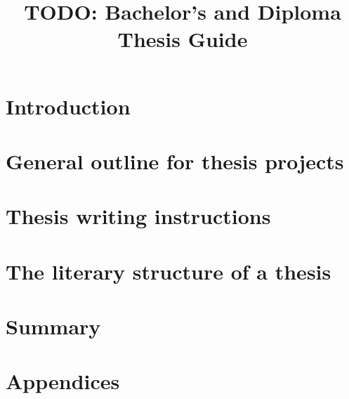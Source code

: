 \documentclass[english, online, cse, master]{dithesis}
\title{TODO: Bachelor's and Diploma Thesis Guide}
\begin{document}
\pagestyle{empty}
\maketitlepage
\makecopyrightpage

 {
  
  
}

\contents %


    
\mainmatter

\chapter{Introduction} %
  \label{introduction} %
  
    
\chapter{General outline for thesis projects}
  \label{relatedwork}
  
    
\chapter{Thesis writing instructions}
  \label{implementation}
  
    
\chapter{The literary structure of a thesis}
  \label{experiments}
  
    
\chapter{Summary}
  \label{summary}
  
    
\printbibliography[heading=bibnumbered, title=\mybibname]

\startappendix
\chapter{Appendices}
  
\end{document}
